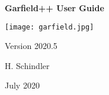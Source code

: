 \begin{titlepage}
  {
  \centering
  \sffamily
  \linespread{1.5}

  \vspace{3cm} 

  \huge{\textbf{Garfield++ User Guide}}

  \vspace{2cm}

  \texttt{[image: garfield.jpg]}

  \vspace{2cm}

  \large
  Version 2020.5

  \vspace{2cm}
  \large
  H. Schindler

  \vfill

  July 2020

  }
\end{titlepage}
